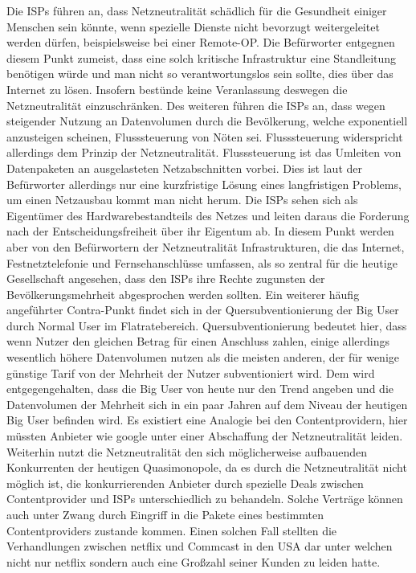 \documentclass[
	12pt,
	a4paper,
	BCOR10mm,
	DIV14,
	listof=totoc,
	bibliography=totoc,
	headsepline
]{scrreprt}
\begin{document}
Die ISPs führen an, dass Netzneutralität schädlich für die Gesundheit einiger Menschen sein könnte, wenn spezielle Dienste nicht bevorzugt weitergeleitet werden dürfen, beispielsweise bei einer Remote-OP.
Die Befürworter entgegnen diesem Punkt zumeist, dass eine solch kritische Infrastruktur eine Standleitung benötigen würde und man nicht so verantwortungslos sein sollte, dies über das Internet zu lösen.
Insofern bestünde keine Veranlassung deswegen die Netzneutralität einzuschränken.
Des weiteren führen die ISPs an, dass wegen steigender Nutzung an Datenvolumen durch die Bevölkerung, welche exponentiell anzusteigen scheinen\cite{nnIrrtum}, Flusssteuerung von Nöten sei. 
Flusssteuerung widerspricht allerdings dem Prinzip der Netzneutralität.
Flusssteuerung ist das Umleiten von Datenpaketen an ausgelasteten Netzabschnitten vorbei.
Dies ist laut der Befürworter allerdings nur eine kurzfristige Lösung eines langfristigen Problems, um einen Netzausbau kommt man nicht herum.
Die ISPs sehen sich als Eigentümer des Hardwarebestandteils des Netzes und leiten daraus die Forderung nach der Entscheidungsfreiheit über ihr Eigentum ab.
In diesem Punkt werden aber von den Befürwortern der Netzneutralität Infrastrukturen, die das Internet, Festnetztelefonie und Fernsehanschlüsse umfassen, als so zentral für die heutige Gesellschaft angesehen, dass den ISPs ihre Rechte zugunsten der Bevölkerungsmehrheit abgesprochen werden sollten.
Ein weiterer häufig angeführter Contra-Punkt findet sich in der Quersubventionierung der Big User durch Normal User im Flatratebereich. 
Quersubventionierung bedeutet hier, dass wenn Nutzer den gleichen Betrag für einen Anschluss zahlen, einige allerdings wesentlich höhere Datenvolumen nutzen als die meisten anderen, der für wenige günstige Tarif von der Mehrheit der Nutzer subventioniert wird.
Dem wird entgegengehalten, dass die Big User von heute nur den Trend angeben und die Datenvolumen der Mehrheit sich in ein paar Jahren auf dem Niveau der heutigen Big User befinden wird.
Es existiert eine Analogie bei den Contentprovidern, hier müssten Anbieter wie google unter einer Abschaffung der Netzneutralität leiden.
Weiterhin nutzt die Netzneutralität den sich möglicherweise aufbauenden Konkurrenten der heutigen Quasimonopole, da es durch die Netzneutralität nicht möglich ist, die konkurrierenden Anbieter durch spezielle Deals zwischen Contentprovider und ISPs unterschiedlich zu behandeln. 
Solche Verträge können auch unter Zwang durch Eingriff in die Pakete eines bestimmten Contentproviders zustande kommen. 
Einen solchen Fall stellten die Verhandlungen zwischen netflix und Commcast in den USA dar \cite{nfvcc} unter welchen nicht nur netflix sondern auch eine Großzahl seiner Kunden zu leiden hatte.
\end{document}
